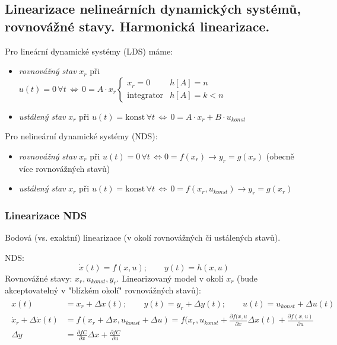 \subsection{Linearizace nelineárních dynamických systémů, rovnovážné stavy. Harmonická linearizace.}
Pro lineární dynamické systémy (LDS) máme:
\begin{itemize}
\item \textit{rovnovážný stav} $ x_r $ při $ u(t) = 0 \, \forall t \, \iff \, 0 = A \cdot x_r \begin{cases} x_r = 0 & h[A] = n \\ \mathrm{integrator} & h[A] = k < n \end{cases} $
\item \textit{ustálený stav} $ x_r $ při $ u(t) = \mathrm{konst} \, \forall t \, \iff \, 0 = A \cdot x_r + B \cdot u_{konst} $
\end{itemize}
Pro nelineární dynamické systémy (NDS):
\begin{itemize}
\item \textit{rovnovážný stav} $ x_r $ při $ u(t) = 0 \, \forall t \, \iff 0 = f(x_r) \to y_r = g(x_r) $ (obecně více rovnovážných stavů)
\item \textit{ustálený stav} $ x_r $ při $ u(t) = \mathrm{konst} \, \forall t \, \iff \, 0 = f(x_r, u_{konst}) \to y_r = g(x_r) $
\end{itemize}

\subsubsection*{Linearizace NDS}
Bodová (vs. exaktní) linearizace (v okolí rovnovážných či ustálených stavů).

NDS:
\begin{equation*}
\dot{x}(t) = f(x,u); \qquad y(t) = h(x,u)
\end{equation*}
Rovnovážné stavy: $ x_r, u_{konst}, y_r $. Linearizovaný model v okolí $ x_r $ (bude akceptovatelný v "blízkém okolí" rovnovážných stavů):
\begin{align*}
\begin{split}
x(t) &= x_r + \Delta x(t); \qquad y(t) = y_r + \Delta y(t); \qquad u(t) = u_{konst} + \Delta u(t) \\
\dot{x}_r + \Delta \dot{x}(t) &= f(x_r + \Delta x, u_{konst} + \Delta u) = f(x_r, u_{konst} + \frac{\partial f(x,u}{\partial x} \Delta x(t) + \frac{\partial f(x,u)}{\partial u} \\ \Delta y &= \frac{\partial f C}{\partial x} \Delta x + \frac{\partial f C}{\partial u}
\end{split}
\end{align*}


